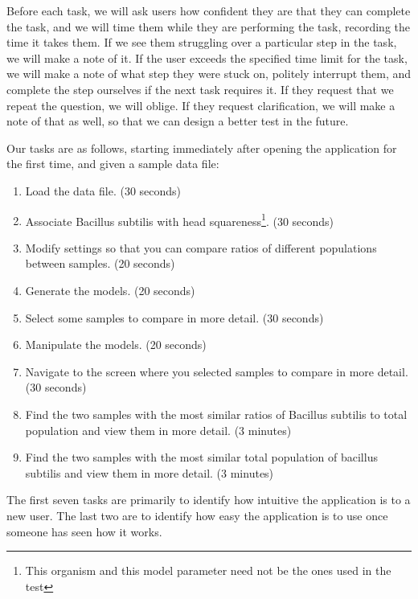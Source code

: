 \documentclass[letterpaper,10pt, onecolumn]{IEEEtran}
\begin{document}
Before each task, we will ask users how confident they are that they can complete the task, and we will time them while they are performing the task, recording the time it takes them. If we see them struggling over a particular step in the task, we will make a note of it. If the user exceeds the specified time limit for the task, we will make a note of what step they were stuck on, politely interrupt them, and complete the step ourselves if the next task requires it. If they request that we repeat the question, we will oblige. If they request clarification, we will make a note of that as well, so that we can design a better test in the future.

Our tasks are as follows, starting immediately after opening the application for the first time, and given a sample data file:
\begin{enumerate}
	\item Load the data file. (30 seconds)
	\item Associate Bacillus subtilis with head squareness\footnote{This organism and this model parameter need not be the ones used in the test}. (30 seconds)
	\item Modify settings so that you can compare ratios of different populations between samples. (20 seconds)
	\item Generate the models. (20 seconds)
	\item Select some samples to compare in more detail. (30 seconds)
	\item Manipulate the models. (20 seconds)
	\item Navigate to the screen where you selected samples to compare in more detail. (30 seconds)
	\item Find the two samples with the most similar ratios of Bacillus subtilis to total population and view them in more detail. (3 minutes)
	\item Find the two samples with the most similar total population of bacillus subtilis and view them in more detail. (3 minutes)
\end{enumerate}

The first seven tasks are primarily to identify how intuitive the application is to a new user. The last two are to identify how easy the application is to use once someone has seen how it works.
\end{document}
